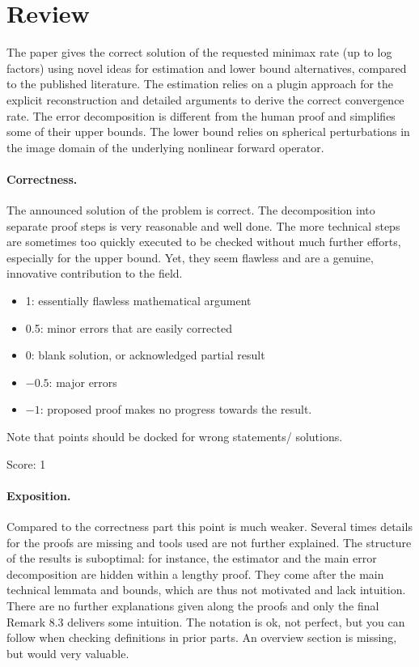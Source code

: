 \documentclass[11pt]{article}
\theoremstyle{remark}
\begin{document}
\maketitle

\section{Review}


The paper gives the correct solution of the requested minimax rate (up to log factors) using novel ideas for estimation and lower bound alternatives, compared to the published literature. The estimation relies on a plugin approach for the explicit reconstruction and detailed arguments to derive the correct convergence rate. The error decomposition is different from the human proof and simplifies some of their upper bounds. The lower bound relies on spherical perturbations in the image domain of the underlying nonlinear forward operator. 

\paragraph{Correctness.}

The announced solution of the problem is correct. The decomposition into separate proof steps is very reasonable and well done. The more technical steps are sometimes too quickly executed to be checked without much further efforts, especially for the upper bound. Yet, they seem flawless and are a genuine, innovative contribution to the field. 


\begin{itemize}
	\item  1: essentially flawless mathematical argument
	\item  0.5: minor errors that are easily corrected
	\item  0: blank solution, or acknowledged partial result
	\item  $-0.5$: major errors
	\item  $-1$: proposed proof makes no progress towards the result.
\end{itemize}
Note that points should be docked for wrong statements/ solutions.

\noindent Score: 1

\paragraph{Exposition.}

Compared to the correctness part this point is much weaker. Several times details for the proofs are missing and tools used are not further explained. The structure of the results is suboptimal: for instance, the estimator and the main error decomposition are hidden within a lengthy proof. They come after the main technical lemmata and bounds, which are thus not motivated and lack intuition. There are no further explanations given along the proofs and only the final Remark 8.3 delivers some intuition. The notation is ok, not perfect, but you can follow when checking definitions in prior parts. An overview section is missing, but would very valuable.
\end{document}
